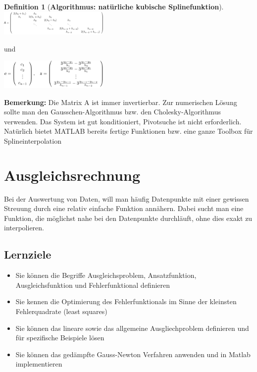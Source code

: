 \documentclass{article}
\newenvironment{Figure}
	{\par\medskip\noindent\minipage{\linewidth}}
	{\endminipage\par\medskip}
\theoremstyle{satz}
\theoremstyle{definition}
\newtheorem{definition}{Definition}
\begin{document}
\begin{tcolorbox}
\begin{definition}[\textbf{Algorithmus: natürliche kubische Splinefunktion}]
\begin{Figure}
\centering
\includegraphics[width=200px]{img/kubischeSpineFunktionAForm.png}
	\label{fig:A-Form für Algorithmus}
\end{Figure}
und
\begin{Figure}
\centering
\includegraphics[width=200px]{img/kubischeSpineFunktionCForm.png}
	\label{fig:c-Form für Algorithmus}
\end{Figure}
\textbf{Bemerkung: } Die Matrix A ist immer invertierbar. Zur numerischen Lösung sollte man den Gausschen-Algorithmus bzw. den Cholesky-Algorithmus verwenden. Das System ist gut konditioniert, Pivotsuche ist nicht erforderlich. Natürlich bietet MATLAB bereits fertige Funktionen bzw. eine ganze Toolbox für Splineinterpolation
\end{definition}
\end{tcolorbox}

\section{Ausgleichsrechnung}
Bei der Auswertung von Daten, will man häufig Datenpunkte mit einer gewissen Streuung durch eine relativ einfache Funktion annähern. Dabei sucht man eine Funktion, die möglichst nahe bei den Datenpunkte durchläuft, ohne dies exakt zu interpolieren. 
\subsection{Lernziele}
\begin{itemize}
	\item Sie können die Begriffe Ausgleichsproblem, Ansatzfunktion, Ausgleichsfunktion und Fehlerfunktional definieren
	\item Sie kennen die Optimierung des Fehlerfunktionals im Sinne der kleinsten Fehlerquadrate (least squares)
	\item Sie können das lineare sowie das allgemeine Ausgliechproblem definieren und für spezifische Beispiele lösen
	\item Sie können das gedämpfte Gauss-Newton Verfahren anwenden und in Matlab implementieren
\end{itemize}
\end{document}

